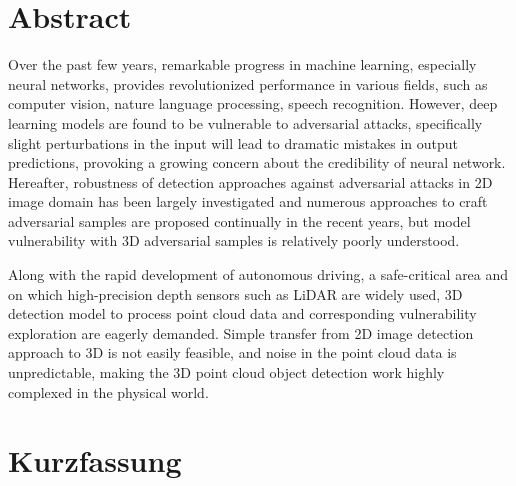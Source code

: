 
\chapter*{Abstract}

Over the past few years, remarkable progress in machine learning, especially neural networks, provides revolutionized performance in various fields, such as computer vision, nature language processing, speech recognition. However, deep learning models are found to be vulnerable to adversarial attacks, specifically slight perturbations in the input will lead to dramatic mistakes in output predictions, provoking a growing concern about the credibility of neural network. Hereafter, robustness of detection approaches against adversarial attacks in 2D image domain has been largely investigated and numerous approaches to craft adversarial samples are proposed continually in the recent years, but model vulnerability with 3D adversarial samples is relatively poorly understood.

Along with the rapid development of autonomous driving, a safe-critical area and on which high-precision depth sensors such as LiDAR are widely used,  3D detection model to process point cloud data and corresponding vulnerability exploration are eagerly demanded. Simple transfer from 2D image detection approach to 3D is not easily feasible, and noise in the point cloud data is unpredictable, making the 3D point cloud object detection work highly complexed in the physical world.  



\chapter*{Kurzfassung}

\blindtext
